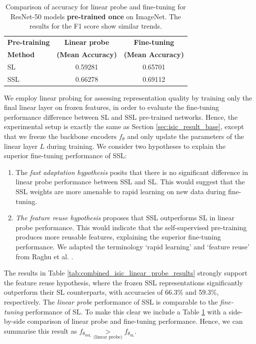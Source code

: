 \documentclass[a4paper,fleqn]{cas-dc}
\begin{document}
\begin{table}[htbp!]
\centering
\begin{tabular}{lcc}
\toprule
\textbf{Pre-training} & \textbf{Linear probe} & \textbf{Fine-tuning} \\
\textbf{Method} & \textbf{(Mean Accuracy)} & \textbf{(Mean Accuracy)} \\ 
\midrule
SL & 0.59281 & 0.65701 \\
SSL & 0.66278 & 0.69112 \\
\bottomrule
\end{tabular}
\caption{Comparison of accuracy for linear probe and fine-tuning for ResNet-50 models \textbf{pre-trained once} on ImageNet. The results for the F1 score show similar trends.}
\label{tab:comparison_table}
\end{table}

We employ linear probing for assessing representation quality by training only the final linear layer on frozen features, in order to evaluate the fine-tuning performance difference between SL and SSL pre-trained networks. Hence, the experimental setup is exactly the same as  Section \ref{sec:isic_result_base}, except that we freeze the backbone encoders $f_\theta$ and only update the parameters of the linear layer $L$  during training. We consider two hypotheses to explain the superior fine-tuning performance of SSL:

 \begin{enumerate}
 
  \item The  \textit{fast adaptation hypothesis} posits that there is no significant difference in linear probe performance between SSL and SL. This would suggest that the SSL weights are more amenable to rapid learning on new data during fine-tuning.
 
  \item \textit{The feature reuse hypothesis} proposes that SSL outperforms SL in linear probe performance. This would indicate that the self-supervised pre-training produces more reusable features, explaining the superior fine-tuning performance. We adapted the terminology `rapid learning' and `feature reuse' from Raghu et al. \cite{raghu2020rapid}.
    
 \end{enumerate}

 
The results in Table \ref{tab:combined_isic_linear_probe_results} strongly support the feature reuse hypothesis, where the frozen SSL representations significantly outperform their SL counterparts, with accuracies of 66.3\% and 59.3\%, respectively. The \textit{linear probe} performance of SSL is comparable to the \textit{fine-tuning} performance of SL. To make this clear we include a Table \ref{tab:comparison_table} with a side-by-side comparison of linear probe and fine-tuning performance. Hence,  we can summarise this result as $f_{\theta_{\scriptscriptstyle\text{SSL}}}\underset{\scriptscriptstyle\text{(linear probe)}}{>} f_{\theta_{\scriptscriptstyle\text{SL}}}$. 
\end{document}
